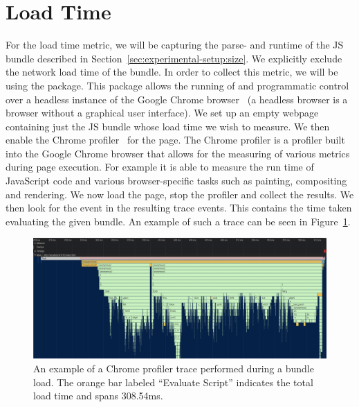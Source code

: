 \section{Load Time}\label{sec:experimental-setup:load-time}
For the load time metric, we will be capturing the parse- and runtime of the JS bundle described in Section~\ref{sec:experimental-setup:size}. We explicitly exclude the network load time of the bundle. In order to collect this metric, we will be using the  package. This package allows the running of and programmatic control over a headless instance of the Google Chrome browser~ (a headless browser is a browser without a graphical user interface). We set up an empty webpage containing just the JS bundle whose load time we wish to measure. We then enable the Chrome profiler~ for the page. The Chrome profiler is a profiler built into the Google Chrome browser that allows for the measuring of various metrics during page execution. For example it is able to measure the run time of JavaScript code and various browser-specific tasks such as painting, compositing and rendering. We now load the page, stop the profiler and collect the results. We then look for the  event in the resulting trace events. This contains the time taken evaluating the given bundle. An example of such a trace can be seen in Figure~\ref{fig:experimental-setup:load-time}.

\begin{figure}[h]
  \includegraphics[width=\columnwidth]{figures/experimental-setup/load-time.png}
  \caption{An example of a Chrome profiler trace performed during a bundle load. The orange bar labeled ``Evaluate Script'' indicates the total load time and spans 308.54ms.}
  \label{fig:experimental-setup:load-time}
  \centering
\end{figure}

